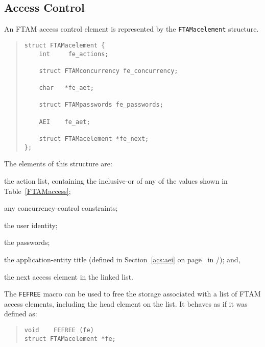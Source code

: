 \subsection	{Access Control}
An FTAM access control element is represented by the \verb"FTAMacelement"
structure.
\begin{quote}\small\begin{verbatim}
struct FTAMacelement {
    int     fe_actions;

    struct FTAMconcurrency fe_concurrency;

    char   *fe_aet;

    struct FTAMpasswords fe_passwords;

    AEI    fe_aet;

    struct FTAMacelement *fe_next;
};
\end{verbatim}\end{quote}
The elements of this structure are:
\begin{describe}
\item[\verb"fe\_actions":] the action list,
containing the inclusive-or of any of the values shown in
Table~\ref{FTAMaccess};

\item[\verb"fe\_concurrency":] any concurrency-control constraints;

\item[\verb"fe\_aet":] the user identity;

\item[\verb"fe\_passwords"] the passwords;

\item[\verb"fe\_aet":] the application-entity title
(defined in Section~\ref{acs:aei} on page~\pageref{acs:aei} in \volone/);
and,

\item[\verb"fe\_next":] the next access element in the linked list.
\end{describe}
The \verb"FEFREE" macro can be used to free the storage associated with a
list of FTAM access elements,
including the head element on the list.
It behaves as if it was defined as:
\begin{quote}\small\begin{verbatim}
void    FEFREE (fe)
struct FTAMacelement *fe;
\end{verbatim}\end{quote}

